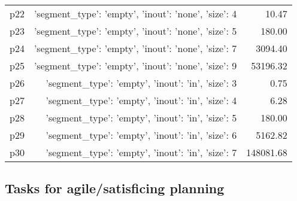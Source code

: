 \documentclass{article}
\begin{document}
\begin{center}
\begin{tabular}{@{}l|r|r@{}}
  p22&{'segment\_type': 'empty', 'inout': 'none', 'size': 4}&10.47\\
  p23&{'segment\_type': 'empty', 'inout': 'none', 'size': 5}&180.00\\
  p24&{'segment\_type': 'empty', 'inout': 'none', 'size': 7}&3094.40\\
  p25&{'segment\_type': 'empty', 'inout': 'none', 'size': 9}&53196.32\\
  p26&{'segment\_type': 'empty', 'inout': 'in', 'size': 3}&0.75\\
  p27&{'segment\_type': 'empty', 'inout': 'in', 'size': 4}&6.28\\
  p28&{'segment\_type': 'empty', 'inout': 'in', 'size': 5}&180.00\\
  p29&{'segment\_type': 'empty', 'inout': 'in', 'size': 6}&5162.82\\
  p30&{'segment\_type': 'empty', 'inout': 'in', 'size': 7}&148081.68
                            \end{tabular}
                            \end{center}
                    

                                \subsection*{Tasks for agile/satisficing planning}
                                
\end{document}
